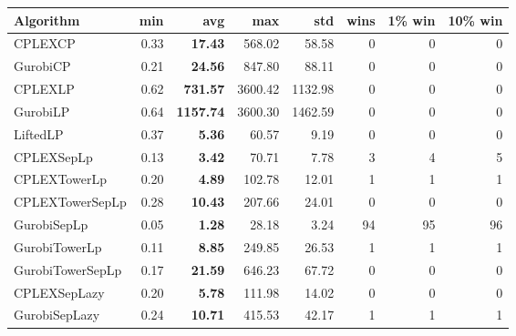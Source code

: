 \begin{tabular}{lrrrrrrr}
Algorithm & min & avg & max & std
& wins & 1\% win & 10\% win 
\\
\hline
CPLEXCP&0.33& \bf17.43& 568.02& 58.58&0&0&0\\
GurobiCP&0.21& \bf24.56& 847.80& 88.11&0&0&0\\
CPLEXLP&0.62& \bf731.57& 3600.42& 1132.98&0&0&0\\
GurobiLP&0.64& \bf1157.74& 3600.30& 1462.59&0&0&0\\
LiftedLP&0.37& \bf5.36& 60.57& 9.19&0&0&0\\
CPLEXSepLp&0.13& \bf3.42& 70.71& 7.78&3&4&5\\
CPLEXTowerLp&0.20& \bf4.89& 102.78& 12.01&1&1&1\\
CPLEXTowerSepLp&0.28& \bf10.43& 207.66& 24.01&0&0&0\\
GurobiSepLp&0.05& \bf1.28& 28.18& 3.24&94&95&96\\
GurobiTowerLp&0.11& \bf8.85& 249.85& 26.53&1&1&1\\
GurobiTowerSepLp&0.17& \bf21.59& 646.23& 67.72&0&0&0\\
CPLEXSepLazy&0.20& \bf5.78& 111.98& 14.02&0&0&0\\
GurobiSepLazy&0.24& \bf10.71& 415.53& 42.17&1&1&1
\end{tabular}
